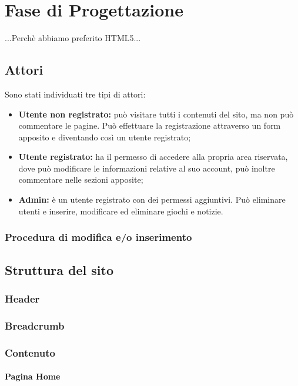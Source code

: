 \section{Fase di Progettazione}
...Perchè abbiamo preferito HTML5...

\subsection{Attori}
Sono stati individuati tre tipi di attori:
\begin{itemize}
	\item \textbf{Utente non registrato:} può visitare tutti i contenuti del sito, ma non può commentare le pagine. Può effettuare la registrazione attraverso un form apposito e diventando così un utente registrato;
	\item \textbf{Utente registrato:} ha il permesso di accedere alla propria area riservata, dove può modificare le informazioni relative al suo account, può inoltre commentare nelle sezioni apposite;
	\item \textbf{Admin:} è un utente registrato con dei permessi aggiuntivi. Può eliminare utenti e inserire, modificare ed eliminare giochi e notizie.
\end{itemize}

\subsubsection{Procedura di modifica e/o inserimento} \label{subsection:modificainserimento}

\subsection{Struttura del sito}

\subsubsection{Header}

\subsubsection{Breadcrumb}

\subsubsection{Contenuto}

\paragraph{Pagina Home} 

